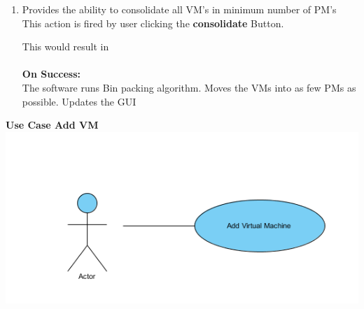 \documentclass[a4paper,11pt]{article}
\begin{document}
\begin{enumerate}
				This would result in \\\\
				{\bf On Success: }\\
				The software moves all the VM's into other PM's with sufficient residual capacity. Then the system is shutdown. 
				The GUI will be updated showing that the PM selected is switched off
				\\
				{\bf On Failure: } \\
				The user will get a message stating that the VM's in the selected PM cannot be accomodated in other PM's.
				\item Provides the ability to consolidate all VM's in minimum number of PM's
				\\This action is fired by user clicking the {\bf consolidate} Button. 
								
				This would result in \\\\
				{\bf On Success: }\\
				The software runs Bin packing algorithm. Moves the VMs into as few PMs as possible. Updates the GUI
				\\
				

			\end{enumerate}
			
			
			{\bf Use Case Add VM}
			\\
			\includegraphics{images/usecase}
			
\end{document}
